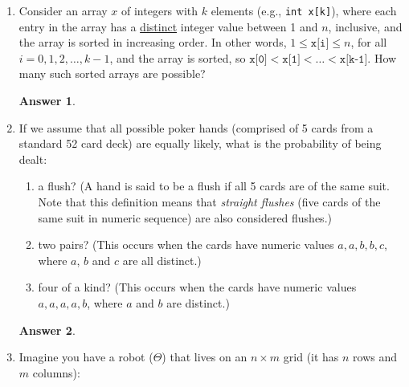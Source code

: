 \documentclass[12pt]{article}
\renewcommand{\(}{\left(}
\renewcommand{\)}{\right)}
\theoremstyle{definition}
\newtheorem*{answer}{Answer}
\begin{document}
\begin{enumerate}
\item Consider an array $x$ of integers with $k$ elements (e.g., \texttt{int x[k]}), where each entry in the array has a \underline{distinct} integer value between 1 and $n$, inclusive, and the array is sorted in increasing order. In other words, $1 \leq \texttt{x[i]} \leq n$, for all $i = 0, 1, 2, \dotsc, k - 1$, and the array is sorted, so $\texttt{x[0]} < \texttt{x[1]} < \dotsc < \texttt{x[k-1]}$.  How many such sorted arrays are possible?

    \begin{shaded}
    \begin{answer}

    \end{answer}
    \end{shaded}
    \newpage


\item If we assume that all possible poker hands (comprised of 5 cards from a standard 52 card deck) are equally likely, what is the probability of being dealt:
    \begin{enumerate}[label=\alph*.]

    \item a flush?  (A hand is said to be a flush if all 5 cards are of the same suit.  Note that this definition means that \emph{straight flushes} (five cards of the same suit in numeric sequence) are also considered flushes.)
    \item two pairs?  (This occurs when the cards have numeric values $a, a, b, b, c$, where $a$, $b$ and $c$ are all distinct.)
    \item four of a kind?  (This occurs when the cards have numeric values $a, a, a, a, b$, where $a$ and $b$ are distinct.)

    \end{enumerate}

    \begin{shaded}
    \begin{answer}

    \end{answer}
    \end{shaded}
    \newpage


\item Imagine you have a robot ($\Theta$) that lives on an $n \times m$ grid (it has $n$ rows and $m$ columns):
%
\begin{center}
\end{center}
\end{enumerate}
\end{document}
